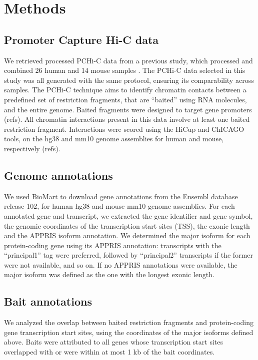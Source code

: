 \section{Methods}
\subsection{Promoter Capture Hi-C data}
We retrieved processed PCHi-C data from a previous study, which processed and combined 26 human and 14 mouse samples \citep{laverre_long-range_2022}. The PCHi-C data selected in this study was all generated with the same protocol, ensuring its comparability across samples. The PCHi-C technique aims to identify chromatin contacts between a predefined set of restriction fragments, that are “baited” using RNA molecules, and the entire genome. Baited fragments were designed to target gene promoters (refs). All chromatin interactions present in this data involve at least one baited restriction fragment. Interactions were scored using the HiCup and ChICAGO tools, on the hg38 and mm10 genome assemblies for human and mouse, respectively (refs). 

\subsection{Genome annotations}
We used BioMart to download gene annotations from the Ensembl database release 102, for human hg38 and mouse mm10 genome assemblies. For each annotated gene and transcript, we extracted the gene identifier and gene symbol, the genomic coordinates of the transcription start sites (TSS), the exonic length and the APPRIS isoform annotation. We determined the major isoform for each protein-coding gene using its APPRIS annotation: transcripts with the “principal1” tag were preferred, followed by “principal2” transcripts if the former were not available, and so on. If no APPRIS annotations were available, the major isoform was defined as the one with the longest exonic length. 

\subsection{Bait annotations}
We analyzed the overlap between baited restriction fragments and protein-coding gene transcription start sites, using the coordinates of the major isoforms defined above. Baits were attributed to all genes whose transcription start sites overlapped with or were within at most 1 kb of the bait coordinates. 

